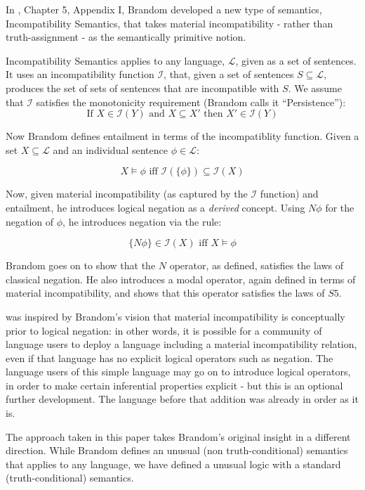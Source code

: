 \NI In \cite{brandom}, Chapter 5, Appendix I, Brandom developed a new
type of semantics, Incompatibility Semantics, that takes material
incompatibility - rather than truth-assignment - as the semantically
primitive notion.

Incompatibility Semantics applies to any language, $\mathcal{L}$,
given as a set of sentences.  It uses an incompatibility function
$\mathcal{I}$, that, given a set of sentences $S \subseteq
\mathcal{L}$, produces the set of sets of sentences that are
incompatible with $S$.  We assume that $\mathcal{I}$ satisfies the
monotonicity requirement (Brandom calls it ``Persistence''):
\[
   \text{If } X \in \mathcal{I}(Y) \text{ and } X \subseteq X' \text{ then } X' \in \mathcal{I}(Y)
\]

\NI Now Brandom defines entailment in terms of the incompatiblity
function. Given a set $X \subseteq \mathcal{L}$ and an individual
sentence $\phi \in \mathcal{L}$:

\[
   X \models \phi \text{ iff } \mathcal{I}(\{\phi\}) \subseteq \mathcal{I}(X)
\]

\NI Now, given material incompatibility (as captured by the
$\mathcal{I}$ function) and entailment, he introduces logical negation
as a \emph{derived} concept. Using $N \phi$ for the negation of
$\phi$, he introduces negation via the rule:

\[
   \{N \phi\} \in \mathcal{I}(X) \text{ iff } X \models \phi
\]

\NI Brandom goes on to show that the $N$ operator, as defined, satisfies
the laws of classical negation.  He also introduces a modal operator,
again defined in terms of material incompatibility, and shows that
this operator satisfies the laws of $S5$.

\ELFULL{} was inspired by Brandom's vision that material
incompatibility is conceptually prior to logical negation: in other
words, it is possible for a community of language users to deploy a
language including a material incompatibility relation, even if that
language has no explicit logical operators such as negation.  The
language users of this simple language may go on to introduce logical
operators, in order to make certain inferential properties explicit -
but this is an optional further development.  The language before that
addition was already in order as it is.

The approach taken in this paper takes Brandom's original insight in a
different direction.  While Brandom defines an unusual (non
truth-conditional) semantics that applies to any language, we have
defined a unusual logic with a standard (truth-conditional) semantics.


